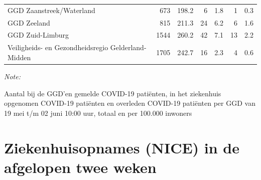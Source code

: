 \documentclass[
  english,
  man,floatsintext]{apa6}
\begin{document}
\begin{table}
\begin{threeparttable}
\begin{tabular}{lrrrrrr}
GGD Zaanstreek/Waterland & 673 & 198.2 & 6 & 1.8 & 1 & 0.3\\
GGD Zeeland & 815 & 211.3 & 24 & 6.2 & 6 & 1.6\\
GGD Zuid-Limburg & 1544 & 260.2 & 42 & 7.1 & 13 & 2.2\\
Veiligheids- en Gezondheidsregio Gelderland-Midden & 1705 & 242.7 & 16 & 2.3 & 4 & 0.6\\
\bottomrule
\end{tabular}
\begin{tablenotes}
\item \textit{Note: } 
\item Aantal bij de GGD’en gemelde COVID-19 patiënten, in het ziekenhuis opgenomen COVID-19 patiënten en overleden COVID-19 patiënten per GGD van 19 mei t/m 02 juni 10:00 uur, totaal en per 100.000 inwoners
\end{tablenotes}
\end{threeparttable}
\endgroup{}
\end{table}

\newpage

\hypertarget{ziekenhuisopnames-nice-in-de-afgelopen-twee-weken}{%
\section{Ziekenhuisopnames (NICE) in de afgelopen twee weken}\label{ziekenhuisopnames-nice-in-de-afgelopen-twee-weken}}
\end{document}
